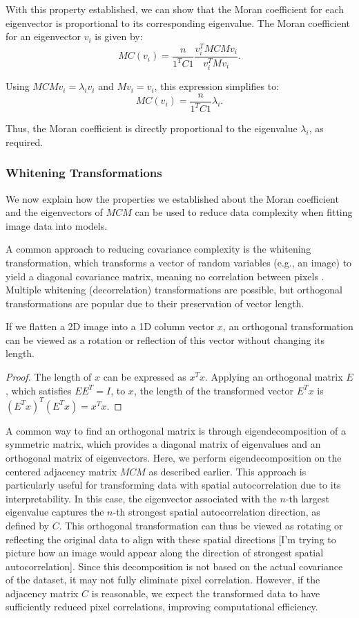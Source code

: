 \documentclass[12pt]{article}
\begin{document}
With this property established, we can show that the Moran coefficient for each eigenvector is proportional to its corresponding eigenvalue. The Moran coefficient for an eigenvector \( v_i \) is given by:
\[
  M C (v_i)=\frac{n}{1^T C 1} \frac{v_i^T M C M v_i}{v_i^T M v_i}.
\]

Using \( M C M v_i = \lambda_i v_i \) and \( M v_i = v_i \), this expression simplifies to:
\[
  M C (v_i)=\frac{n}{1^T C 1} \lambda_i.
\]

Thus, the Moran coefficient is directly proportional to the eigenvalue \( \lambda_i \), as required.

\subsubsection{Whitening Transformations}

We now explain how the properties we established about the Moran coefficient and the eigenvectors of \( M C M \) can be used to reduce data complexity when fitting image data into models.

A common approach to reducing covariance complexity is the whitening transformation, which transforms a vector of random variables (e.g., an image) to yield a diagonal covariance matrix, meaning no correlation between pixels . Multiple whitening (decorrelation) transformations are possible, but orthogonal transformations are popular due to their preservation of vector length.

If we flatten a 2D image into a 1D column vector \( x \), an orthogonal transformation can be viewed as a rotation or reflection of this vector without changing its length.
\begin{proof}
  The length of \( x \) can be expressed as \( x^T x \). Applying an orthogonal matrix \( E \), which satisfies \( E E^T = I \), to \( x \), the length of the transformed vector \( E^T x \) is \( (E^T x)^T (E^T x) = x^T x \).
\end{proof}

A common way to find an orthogonal matrix is through eigendecomposition of a symmetric matrix, which provides a diagonal matrix of eigenvalues and an orthogonal matrix of eigenvectors. Here, we perform eigendecomposition on the centered adjacency matrix \( M C M \) as described earlier. This approach is particularly useful for transforming data with spatial autocorrelation due to its interpretability. In this case, the eigenvector associated with the \( n \)-th largest eigenvalue captures the \( n \)-th strongest spatial autocorrelation direction, as defined by \( C \). This orthogonal transformation can thus be viewed as rotating or reflecting the original data to align with these spatial directions [I'm trying to picture how an image would appear along the direction of strongest spatial autocorrelation]. Since this decomposition is not based on the actual covariance of the dataset, it may not fully eliminate pixel correlation. However, if the adjacency matrix \( C \) is reasonable, we expect the transformed data to have sufficiently reduced pixel correlations, improving computational efficiency.
\end{document}
